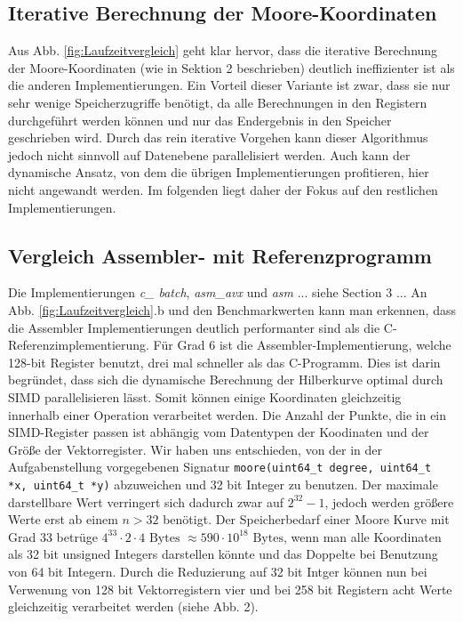 \documentclass[course=erap]{aspdoc}
\begin{document}
 \FloatBarrier
 \subsection{Iterative Berechnung der Moore-Koordinaten}
Aus Abb. \ref{fig:Laufzeitvergleich} geht klar hervor, dass die iterative Berechnung der Moore-Koordinaten (wie in Sektion 2 beschrieben) deutlich ineffizienter ist als die anderen Implementierungen. Ein Vorteil dieser Variante ist zwar, dass sie nur sehr wenige Speicherzugriffe benötigt, da alle Berechnungen in den Registern durchgeführt werden können und nur das Endergebnis in den Speicher geschrieben wird. Durch das rein iterative Vorgehen kann dieser Algorithmus jedoch nicht sinnvoll auf Datenebene parallelisiert werden. Auch kann der dynamische Ansatz, von dem die übrigen Implementierungen profitieren, hier nicht angewandt werden. Im folgenden liegt daher der Fokus auf den restlichen Implementierungen.

\subsection{Vergleich Assembler- mit Referenzprogramm}
Die Implementierungen \textit{c\_ batch}, \textit{asm\_avx} und \textit{asm} ... siehe Section 3 ... \newline
An Abb. \ref{fig:Laufzeitvergleich}.b und den Benchmarkwerten kann man erkennen, dass die Assembler Implementierungen deutlich performanter sind als die C-Referenzimplementierung. Für Grad 6 ist die Assembler-Implementierung, welche 128-bit Register benutzt, drei mal schneller als das C-Programm. Dies ist darin begründet, dass sich die dynamische Berechnung der Hilberkurve optimal durch SIMD parallelisieren lässt. Somit können einige Koordinaten gleichzeitig innerhalb einer Operation verarbeitet werden. Die Anzahl der Punkte, die in ein SIMD-Register passen ist abhängig vom Datentypen der Koodinaten und der Größe der Vektorregister. Wir haben uns entschieden, von der in der Aufgabenstellung vorgegebenen Signatur \texttt{moore(uint64\_t degree, uint64\_t *x, uint64\_t *y)} abzuweichen und 32 bit Integer zu benutzen. Der maximale darstellbare Wert verringert sich dadurch zwar auf $2^{32}-1$, jedoch werden größere Werte erst ab einem $n > 32$ benötigt. Der Speicherbedarf einer Moore Kurve mit Grad 33 betrüge $4^{33} \cdot 2 \cdot 4 \text{ Bytes } \approx 590 \cdot 10^{18} \text{ Bytes}$, wenn man alle Koordinaten als 32 bit unsigned Integers darstellen könnte und das Doppelte bei Benutzung von 64 bit Integern. 
\newline
Durch die Reduzierung auf 32 bit Intger können nun bei Verwenung von 128 bit Vektorregistern vier und bei 258 bit Registern acht Werte gleichzeitig verarbeitet werden (siehe Abb. 2).
\end{document}

